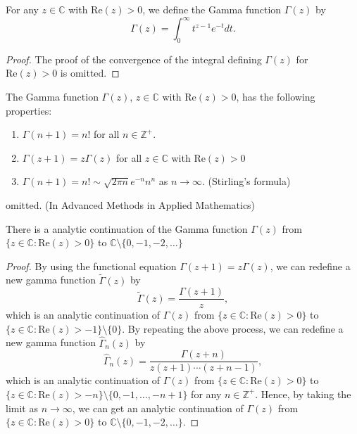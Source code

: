 \documentclass{elegantbook}
\begin{document}
\begin{definition}
  For any $z\in\mathbb{C}$ with $\mathrm{Re}(z) > 0$, we define the Gamma function $\Gamma(z)$ by
  \[
    \Gamma(z) = \int_{0}^{\infty} t^{z-1} e^{-t} dt.
  \]
\end{definition}

\begin{proof}
  The proof of the convergence of the integral defining $\Gamma(z)$ for $\mathrm{Re}(z) > 0$ is omitted.
\end{proof}

\begin{proposition}
  The Gamma function $\Gamma(z)$, $z\in\mathbb{C}$ with $\mathrm{Re}(z) > 0$, has the following properties:
  \begin{enumerate}
    \item $\Gamma(n+1) = n!$ for all $n\in\mathbb{Z}^+$.
    \item $\Gamma(z+1) = z\Gamma(z)$ for all $z\in\mathbb{C}$ with $\mathrm{Re}(z) > 0$
    \item $\Gamma(n+1) = n! \sim \sqrt{2\pi n} e^{-n} n^n$ as $n \to \infty$. (Stirling's formula)
  \end{enumerate}
\end{proposition}

\begin{solution}
  omitted. (In Advanced Methods in Applied Mathematics)
\end{solution}

\begin{theorem} \label{thm:analytic_continuation_of_gamma_function}
  There is a analytic continuation of the Gamma function $\Gamma(z)$ from $\{z\in\mathbb{C} : \mathrm{Re}(z) > 0\}$ to $\mathbb{C}\setminus\{0,-1,-2,\ldots\}$
\end{theorem}

\begin{proof}
  By using the functional equation $\Gamma(z+1) = z\Gamma(z)$, we can redefine a new gamma function $\widetilde{\Gamma}(z)$ by
  \[
    \widetilde{\Gamma}(z) = \frac{\Gamma(z+1)}{z},
  \]
  which is an analytic continuation of $\Gamma(z)$ from $\{z\in\mathbb{C} : \mathrm{Re}(z) > 0\}$ to $\{z\in\mathbb{C} : \mathrm{Re}(z) > -1\}\setminus\{0\}$. 
  By repeating the above process, we can redefine a new gamma function $\widehat{\Gamma}_n(z)$ by
  \[
    \widehat{\Gamma}_n(z) = \frac{\Gamma(z+n)}{z(z+1)\cdots(z+n-1)},
  \]
  which is an analytic continuation of $\Gamma(z)$ from $\{z\in\mathbb{C} : \mathrm{Re}(z) > 0\}$ to $\{z\in\mathbb{C} : \mathrm{Re}(z) > -n\}\setminus\{0,-1,\ldots,-n+1\}$ for any $n\in\mathbb{Z}^+$. Hence, by taking the limit as $n \to \infty$, we can get an analytic continuation of $\Gamma(z)$ from $\{z\in\mathbb{C} : \mathrm{Re}(z) > 0\}$ to $\mathbb{C}\setminus\{0,-1,-2,\ldots\}$.
\end{proof}
\end{document}
